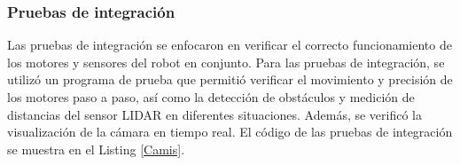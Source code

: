     \subsubsection{Pruebas de integraci\'on} %
    \label{ssub:Pruebas de integraci\'on}
        Las pruebas de integraci\'on se enfocaron en verificar el correcto funcionamiento de los motores y sensores del robot en conjunto. 
        Para las pruebas de integraci\'on, se utiliz\'o un programa de prueba que permiti\'o verificar el movimiento y precisi\'on de los motores 
        paso a paso, as\'i como la detecci\'on de obst\'aculos y medici\'on de distancias del sensor LIDAR en diferentes situaciones. 
        Adem\'as, se verific\'o la visualizaci\'on de la c\'amara en tiempo real. 
        \vskip 0.5cm
        El c\'odigo de las pruebas de integraci\'on se muestra en el Listing \ref{Camis}.
